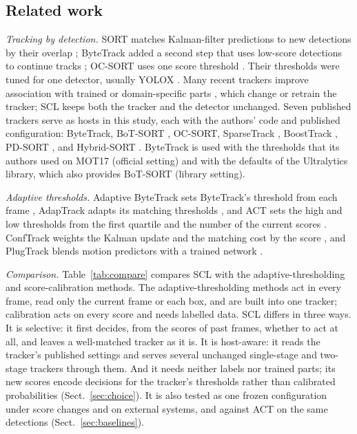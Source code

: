 \documentclass[pdflatex,sn-mathphys-num,iicol]{sn-jnl}
\newcommand{\scl}{SCL}
\begin{document}
\subsection{Related work}\label{sec:survey}
\emph{Tracking by detection.}\label{sec:hosts} SORT matches Kalman-filter predictions to new
detections by their overlap \cite{bewley2016sort}; ByteTrack added a second step that uses
low-score detections to continue tracks \cite{zhang2022bytetrack}; OC-SORT uses one score
threshold \cite{cao2023ocsort}. Their thresholds were tuned for one detector, usually YOLOX
\cite{ge2021yolox}. Many recent trackers improve association with trained or domain-specific
parts \cite{li2024fdbtrack,bao2024graphmatching,zhang2025sinkhorn,ding2025remot,liang2024motiontrack,sun2026bsr},
which change or retrain the tracker; \scl{} keeps both the tracker and the detector unchanged.
Seven published trackers serve as hosts in this study, each with the authors' code and published
configuration: ByteTrack, BoT-SORT \cite{aharon2022botsort}, OC-SORT, SparseTrack
\cite{liu2025sparsetrack}, BoostTrack \cite{stanojevic2024boosttrack}, PD-SORT
\cite{wang2025pdsort}, and Hybrid-SORT \cite{yang2024hybridsort}. ByteTrack is used with the
thresholds that its authors used on MOT17 (official setting) and with the defaults of the
Ultralytics library, which also provides BoT-SORT (library setting).

\emph{Adaptive thresholds.} Adaptive ByteTrack sets ByteTrack's threshold from each frame
\cite{ma2023adaptivebytetrack}, AdapTrack adapts its matching thresholds \cite{shim2024adaptrack},
and ACT sets the high and low thresholds from the first quartile and the number of the current
scores \cite{act2026adaptive}. ConfTrack weights the Kalman update and the matching cost by the
score \cite{jung2024conftrack}, and PlugTrack blends motion predictors with a trained network
\cite{kim2026plugtrack}.

\emph{Comparison.} Table~\ref{tab:compare} compares \scl{} with the adaptive-thresholding and
score-calibration methods. The adaptive-thresholding methods act in every frame, read only the
current frame or each box, and are built into one tracker; calibration acts on every score and
needs labelled data. \scl{} differs in three ways. It is selective: it first decides, from the
scores of past frames, whether to act at all, and leaves a well-matched tracker as it is. It is
host-aware: it reads the tracker's published settings and serves several unchanged single-stage
and two-stage trackers through them. And it needs neither labels nor trained parts; its new scores
encode decisions for the tracker's thresholds rather than calibrated probabilities
(Sect.~\ref{sec:choice}). It is also tested as one frozen configuration under score changes and on
external systems, and against ACT on the same detections (Sect.~\ref{sec:baselines}).
\end{document}
